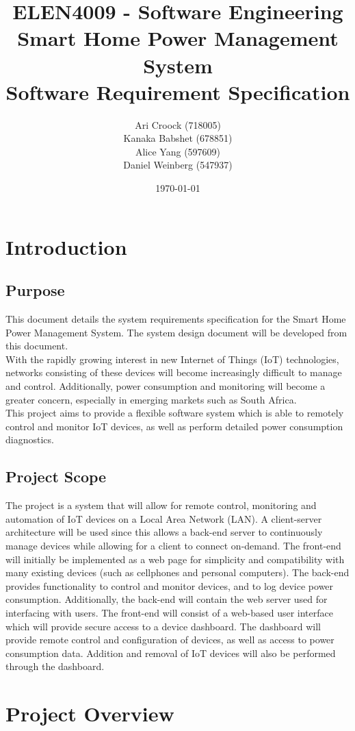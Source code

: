\documentclass[11pt, a4paper]{article}
\title{ELEN4009 - Software Engineering\\Smart Home Power Management System\\Software Requirement Specification}
\author{Ari Croock (718005)\\Kanaka Babshet (678851)\\Alice Yang (597609)\\Daniel Weinberg (547937)}
\date{\today}
\begin{document}
	\maketitle
	\section{Introduction}
	\subsection{Purpose}
	This document details the system requirements specification for the Smart Home Power Management System. The system design document will be developed from this document.\\
	\noindent
	With the rapidly growing interest in new Internet of Things (IoT) technologies, networks consisting of these devices will become increasingly difficult to manage and control. Additionally, power consumption and monitoring will become a greater concern, especially in emerging markets such as South Africa.\\
	\noindent
	This project aims to provide a flexible software system which is able to remotely control and monitor IoT devices, as well as perform detailed power consumption diagnostics.
	
	\subsection{Project Scope}
	The project is a system that will allow for remote control, monitoring and automation of IoT devices on a Local Area Network (LAN). A client-server architecture will be used since this allows a back-end server to continuously manage devices while allowing for a client to connect on-demand. The front-end will initially be implemented as a web page for simplicity and compatibility with many existing devices (such as cellphones and personal computers).
	\noindent
	The back-end provides functionality to control and monitor devices, and to log device power consumption. Additionally, the back-end will contain the web server used for interfacing with users.
	\noindent
	The front-end will consist of a web-based user interface which will provide secure access to a device dashboard. The dashboard will provide remote control and configuration of devices, as well as access to power consumption data. Addition and removal of IoT devices will also be performed through the dashboard. 
	
	\section{Project Overview}
	
\end{document}
